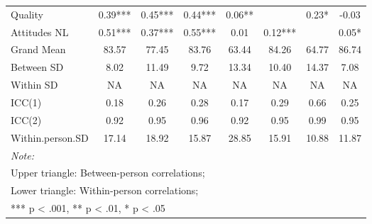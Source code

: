 \begin{table}
\begin{minipage}[t][\textheight][t]{\textwidth}
{\begin{tabular}[t]{lccccccc}
\hspace{1em}Quality & 0.39*** & 0.45*** & 0.44*** & 0.06** &  & 0.23* & -0.03\\
\hspace{1em}Attitudes NL & 0.51*** & 0.37*** & 0.55*** & 0.01 & 0.12*** &  & 0.05*\\
\addlinespace
\hspace{1em}Grand Mean & 83.57 & 77.45 & 83.76 & 63.44 & 84.26 & 64.77 & 86.74\\
\hspace{1em}Between SD & 8.02 & 11.49 & 9.72 & 13.34 & 10.40 & 14.37 & 7.08\\
\hspace{1em}Within SD & NA & NA & NA & NA & NA & NA & NA\\
\hspace{1em}ICC(1) & 0.18 & 0.26 & 0.28 & 0.17 & 0.29 & 0.66 & 0.25\\
\hspace{1em}ICC(2) & 0.92 & 0.95 & 0.96 & 0.92 & 0.95 & 0.99 & 0.95\\
\hspace{1em}Within.person.SD & 17.14 & 18.92 & 15.87 & 28.85 & 15.91 & 10.88 & 11.87\\
\bottomrule
\multicolumn{8}{l}{\rule{0pt}{1em}\textit{Note: }}\\
\multicolumn{8}{l}{\rule{0pt}{1em}Upper triangle: Between-person correlations;}\\
\multicolumn{8}{l}{\rule{0pt}{1em}Lower triangle: Within-person correlations;}\\
\multicolumn{8}{l}{\rule{0pt}{1em}*** p < .001, ** p < .01,  * p < .05}\\
\end{tabular}}
\end{minipage}
\end{table}
